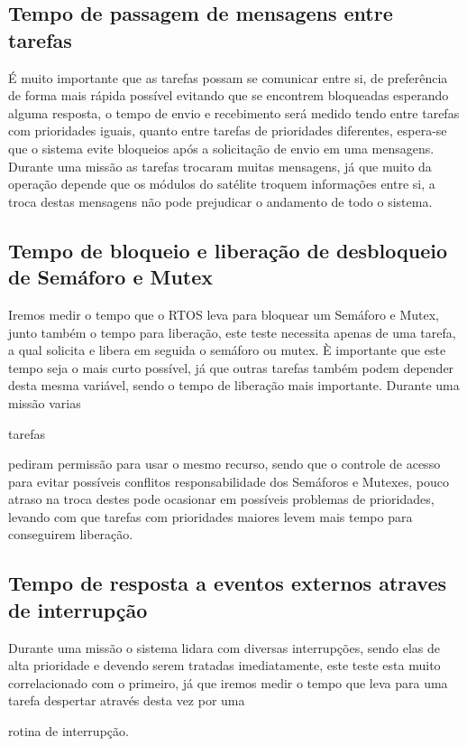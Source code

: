 \subsection{Tempo de passagem de mensagens entre tarefas}
É muito importante que as tarefas possam se comunicar entre si, de preferência de
forma mais rápida possível evitando que se encontrem bloqueadas esperando alguma
resposta, o tempo de envio e recebimento será medido tendo entre tarefas com prioridades
iguais, quanto entre tarefas de prioridades diferentes, espera-se que o sistema evite
bloqueios após a solicitação de envio em uma mensagens. Durante uma missão as tarefas
trocaram muitas mensagens, já que muito da operação depende que os módulos do satélite
troquem informações entre si, a troca destas mensagens não pode prejudicar o andamento
de todo o sistema.

\subsection{Tempo de bloqueio e liberação de desbloqueio de Semáforo e Mutex}
Iremos medir o tempo que o RTOS leva para bloquear um Semáforo e Mutex, junto também
o tempo para liberação, este teste necessita apenas de uma tarefa, a qual solicita e
libera em seguida o semáforo ou mutex. È importante que este tempo seja o mais curto
possível, já que outras tarefas também podem depender desta mesma variável, sendo o
tempo de liberação mais importante. Durante uma missão varias

tarefas

pediram permissão
para usar o mesmo recurso, sendo que o controle de acesso para evitar possíveis
conflitos responsabilidade dos Semáforos e Mutexes, pouco atraso na troca destes pode
ocasionar em possíveis problemas de prioridades, levando com que tarefas com prioridades
maiores levem mais tempo para conseguirem liberação.

\subsection{Tempo de resposta a eventos externos atraves de interrupção}
Durante uma missão o sistema lidara com diversas interrupções, sendo elas de alta
prioridade e devendo serem tratadas imediatamente, este teste esta muito
correlacionado com o primeiro, já que iremos medir o tempo que leva para uma tarefa
despertar através desta vez por uma

rotina de interrupção.

